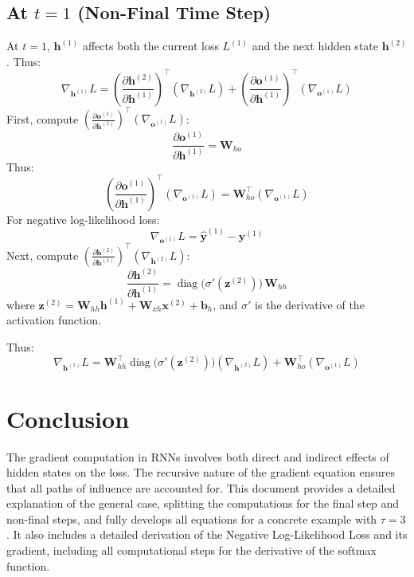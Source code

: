\begin{notechapter}
\subsection{At \(t = 1\) (Non-Final Time Step)}
At \(t = 1\), \(\mathbf{h}^{(1)}\) affects both the current loss \(L^{(1)}\) 
and the next hidden state \(\mathbf{h}^{(2)}\). Thus:
\[
\nabla_{\mathbf{h}^{(1)}} L = 
\left( \frac{\partial \mathbf{h}^{(2)}}{\partial \mathbf{h}^{(1)}} \right)^\top 
\left( \nabla_{\mathbf{h}^{(2)}} L \right) + 
\left( \frac{\partial \mathbf{o}^{(1)}}{\partial \mathbf{h}^{(1)}} \right)^\top 
\left( \nabla_{\mathbf{o}^{(1)}} L \right)
\]
First, compute \(\left( \frac{\partial \mathbf{o}^{(1)}}{\partial \mathbf{h}^{(1)}} \right)^\top 
\left( \nabla_{\mathbf{o}^{(1)}} L \right)\):
\[
\frac{\partial \mathbf{o}^{(1)}}{\partial \mathbf{h}^{(1)}} = \mathbf{W}_{ho}
\]
Thus:
\[
\left( \frac{\partial \mathbf{o}^{(1)}}{\partial \mathbf{h}^{(1)}} \right)^\top 
\left( \nabla_{\mathbf{o}^{(1)}} L \right) = 
\mathbf{W}_{ho}^\top \left( \nabla_{\mathbf{o}^{(1)}} L \right)
\]
For negative log-likelihood loss:
\[
\nabla_{\mathbf{o}^{(1)}} L = \hat{\mathbf{y}}^{(1)} - \mathbf{y}^{(1)}
\]
Next, compute \(\left( \frac{\partial \mathbf{h}^{(2)}}{\partial \mathbf{h}^{(1)}} \right)^\top 
\left( \nabla_{\mathbf{h}^{(2)}} L \right)\):
\[
\frac{\partial \mathbf{h}^{(2)}}{\partial \mathbf{h}^{(1)}} = 
\operatorname{diag}\big(\sigma'(\mathbf{z}^{(2)})\big)\, \mathbf{W}_{hh}
\]
where \(\mathbf{z}^{(2)} = \mathbf{W}_{hh} \mathbf{h}^{(1)} + 
\mathbf{W}_{xh} \mathbf{x}^{(2)} + \mathbf{b}_h\), and \(\sigma'\) is the 
derivative of the activation function.

Thus:
\[
\nabla_{\mathbf{h}^{(1)}} L = 
\mathbf{W}_{hh}^\top \operatorname{diag}\big(\sigma'(\mathbf{z}^{(2)})\big) 
\left( \nabla_{\mathbf{h}^{(2)}} L \right) + 
\mathbf{W}_{ho}^\top \left( \nabla_{\mathbf{o}^{(1)}} L \right)
\]

\section{Conclusion}
The gradient computation in RNNs involves both direct and indirect 
effects of hidden states on the loss. The recursive nature of the 
gradient equation ensures that all paths of influence are accounted for. 
This document provides a detailed explanation of the general case, 
splitting the computations for the final step and non-final steps, and 
fully develops all equations for a concrete example with \(\tau = 3\). 
It also includes a detailed derivation of the Negative Log-Likelihood 
Loss and its gradient, including all computational steps for the derivative 
of the softmax function.
\end{notechapter}

